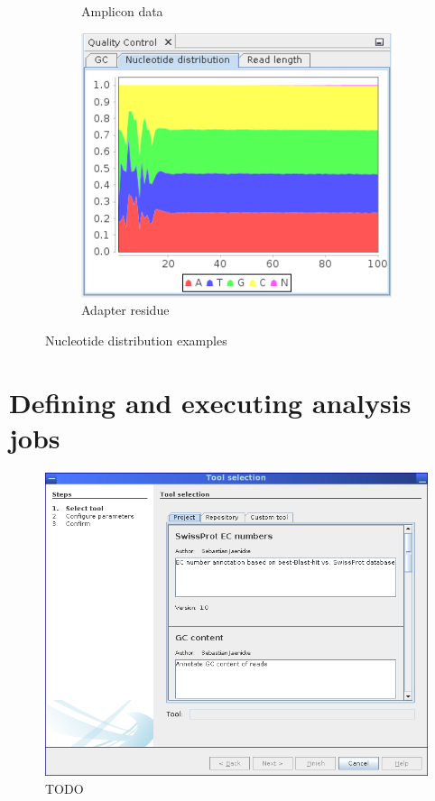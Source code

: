 \begin{figure}
\begin{subfigure}[b]{0.3\textwidth}
                \caption{Amplicon data}
        \end{subfigure}
        \begin{subfigure}[b]{0.3\textwidth}
                \includegraphics[width=\textwidth]{img/mgx/adapterNucl}
                \caption{Adapter residue}
        \end{subfigure}
        \caption{Nucleotide distribution examples}
\end{figure}



\section{Defining and executing analysis jobs}

\begin{figure}[H]
\centering
\includegraphics[width=.8\textwidth]{img/mgx/analysiswiz1}
\caption[Analysis selection]{TODO}
\label{anawiz1}
\end{figure}

